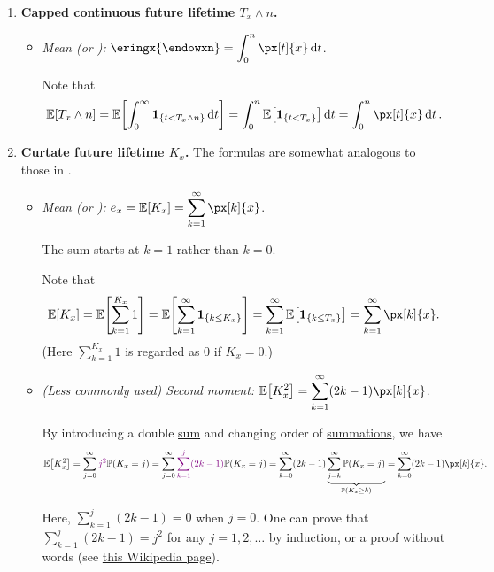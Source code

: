 \begin{enumerate}
\item\label{it:capped-tx-mean} \textbf{Capped continuous future lifetime \(T_x\wedge n\).}
\begin{itemize}
\item \emph{Mean (or ):}
\(\displaystyle \eringx{\endowxn}=\int_{0}^{n}\px[t]{x}\dd{t}\).

\begin{pf}
Note that
\[
\expv{T_x\wedge n}
=\expv{\int_{0}^{\infty}\indicset{t<T_x\wedge n}\dd{t}}
=\int_{0}^{n}\expv{\indicset{t<T_x}}\dd{t}
=\int_{0}^{n}\px[t]{x}\dd{t}.
\]
\end{pf}
\end{itemize}

\item \label{it:kx-mom} \textbf{Curtate future lifetime \(K_x\).} The formulas are somewhat
analogous to those in .
\begin{itemize}
\item \emph{Mean (or ):} \(\displaystyle
e_x=\expv{K_x}=\sum_{k=1}^{\infty}\px[k]{x}\). \begin{warning}
The sum starts at \(k=1\) rather than \(k=0\).
\end{warning}

\begin{pf}
Note that
\[
\expv{K_x}=\expv{\sum_{k=1}^{K_x}1}=\expv{\sum_{k=1}^{\infty}\indicset{k\le K_x}}
=\sum_{k=1}^{\infty}\expv{\indicset{k\le T_x}}
=\sum_{k=1}^{\infty}\px[k]{x}.
\]
(Here \(\sum_{k=1}^{K_x}1\) is regarded as \(0\) if \(K_x=0\).)
\end{pf}
\item \emph{(Less commonly used) Second moment:} \(\displaystyle
\expv{K_x^2}=\sum_{k=1}^{\infty}(2k-1)\px[k]{x}\).

\begin{pf}
By introducing a double \underline{sum} and changing order of
\underline{summations}, we have
\[
\expv{K_x^2}=\sum_{j=0}^{\infty}\vc{j^2}\prob{K_x=j}
=\sum_{j=0}^{\infty}\vc{\sum_{k=1}^{j}(2k-1)}\prob{K_x=j}
=\sum_{k=0}^{\infty}(2k-1)\underbrace{\sum_{j=k}^{\infty}\prob{K_x=j}}_{\prob{K_x\ge k}}
=\sum_{k=0}^{\infty}(2k-1)\px[k]{x}.
\]
\begin{note}
Here, \(\sum_{k=1}^{j}(2k-1)=0\) when \(j=0\). One can prove that
\(\sum_{k=1}^{j}(2k-1)=j^{2}\) for any \(j=1,2,\dotsc\) by induction, or a proof
without words (see
\href{https://en.m.wikipedia.org/wiki/Proof_without_words#Sum_of_odd_numbers}{this
Wikipedia page}).
\end{note}
\end{pf}


\end{itemize}
\end{enumerate}
